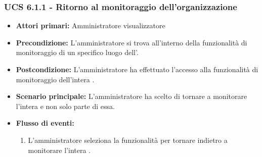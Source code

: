 \subsubsection{UCS 6.1.1 - Ritorno al monitoraggio dell'organizzazione}
\begin{itemize}
	\item \textbf{Attori primari:} Amministratore visualizzatore
	\item \textbf{Precondizione:} L'amministratore si trova all'interno della funzionalità di monitoraggio di un specifico luogo dell'.
	\item \textbf{Postcondizione:} L'amministratore ha effettuato l'accesso alla funzionalità di monitoraggio dell'intera .
	\item \textbf{Scenario principale:} L'amministratore ha scelto di tornare a monitorare l'intera  e non solo parte di essa.
	\item \textbf{Flusso di eventi:}
    \begin{enumerate}
        \item  L'amministratore seleziona la funzionalità per tornare indietro a monitorare l'intera .
    \end{enumerate}
\end{itemize}

